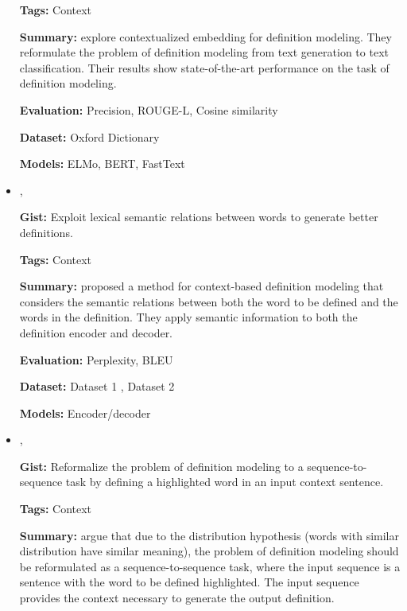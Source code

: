 \documentclass{article}[a4paper]
\newcommand{\bitem}[2]{
    \item[\cite{#1}]
        \textbf{\citetitle{#1}}

        \citeauthor{#1}, \citeyear{#1}
        \newline\newline
        {#2}
}%
\begin{document}
\begin{itemize}
{        \textbf{Tags:}
        Context

        \textbf{Summary:}
        \citeauthor{chang_what_2019} explore contextualized embedding for
        definition modeling. They reformulate the problem of definition modeling
        from text generation to text classification. Their results show
        state-of-the-art performance on the task of definition modeling.

        \textbf{Evaluation:}
        Precision, ROUGE-L, Cosine similarity

        \textbf{Dataset:}
        Oxford Dictionary

        \textbf{Models:}
        ELMo, BERT, FastText
    }%

    \bitem{washio_bridging_2019}%
    {%
        \textbf{Gist:}
        Exploit lexical semantic relations between words to generate better
        definitions.

        \textbf{Tags:}
        Context

        \textbf{Summary:}
        \citeauthor{washio_bridging_2019} proposed a method for context-based
        definition modeling that considers the semantic relations between both
        the word to be defined and the words in the definition. They apply
        semantic information to both the definition encoder and decoder.

        \textbf{Evaluation:}
        Perplexity, BLEU

        \textbf{Dataset:}
        Dataset 1 \cite{noraset_definition_2016},
        Dataset 2 \cite{gadetsky_conditional_2018}

        \textbf{Models:}
        Encoder/decoder
    }%

    \bitem{mickus_mark_2019}%
    {%
        \textbf{Gist:}
        Reformalize the problem of definition modeling to a sequence-to-sequence
        task by defining a highlighted word in an input context sentence.

        \textbf{Tags:}
        Context

        \textbf{Summary:}
        \citeauthor{mickus_mark_2019} argue that due to the distribution
        hypothesis (words with similar distribution have similar meaning), the
        problem of definition modeling should be reformulated as a
        sequence-to-sequence task, where the input sequence is a sentence with
        the word to be defined highlighted. The input sequence provides the
        context necessary to generate the output definition.

}
\end{itemize}
\end{document}
